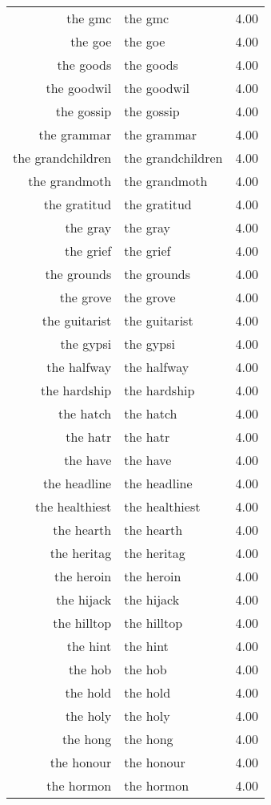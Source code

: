 \begin{table}[ht]
\begin{tabular}{rlr}
  the gmc & the gmc & 4.00 \\ 
  the goe & the goe & 4.00 \\ 
  the goods & the goods & 4.00 \\ 
  the goodwil & the goodwil & 4.00 \\ 
  the gossip & the gossip & 4.00 \\ 
  the grammar & the grammar & 4.00 \\ 
  the grandchildren & the grandchildren & 4.00 \\ 
  the grandmoth & the grandmoth & 4.00 \\ 
  the gratitud & the gratitud & 4.00 \\ 
  the gray & the gray & 4.00 \\ 
  the grief & the grief & 4.00 \\ 
  the grounds & the grounds & 4.00 \\ 
  the grove & the grove & 4.00 \\ 
  the guitarist & the guitarist & 4.00 \\ 
  the gypsi & the gypsi & 4.00 \\ 
  the halfway & the halfway & 4.00 \\ 
  the hardship & the hardship & 4.00 \\ 
  the hatch & the hatch & 4.00 \\ 
  the hatr & the hatr & 4.00 \\ 
  the have & the have & 4.00 \\ 
  the headline & the headline & 4.00 \\ 
  the healthiest & the healthiest & 4.00 \\ 
  the hearth & the hearth & 4.00 \\ 
  the heritag & the heritag & 4.00 \\ 
  the heroin & the heroin & 4.00 \\ 
  the hijack & the hijack & 4.00 \\ 
  the hilltop & the hilltop & 4.00 \\ 
  the hint & the hint & 4.00 \\ 
  the hob & the hob & 4.00 \\ 
  the hold & the hold & 4.00 \\ 
  the holy & the holy & 4.00 \\ 
  the hong & the hong & 4.00 \\ 
  the honour & the honour & 4.00 \\ 
  the hormon & the hormon & 4.00 \\ 

\end{tabular}
\end{table}
